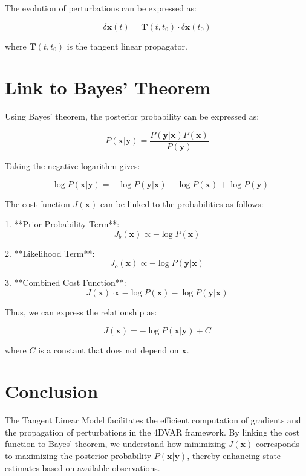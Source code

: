 \documentclass{article}
\begin{document}
The evolution of perturbations can be expressed as:

\[
\delta \mathbf{x}(t) = \mathbf{T}(t, t_0) \cdot \delta \mathbf{x}(t_0)
\]

where \( \mathbf{T}(t, t_0) \) is the tangent linear propagator.

\section{Link to Bayes' Theorem}

Using Bayes' theorem, the posterior probability can be expressed as:

\[
P(\mathbf{x} | \mathbf{y}) = \frac{P(\mathbf{y} | \mathbf{x}) P(\mathbf{x})}{P(\mathbf{y})}
\]

Taking the negative logarithm gives:

\[
-\log P(\mathbf{x} | \mathbf{y}) = -\log P(\mathbf{y} | \mathbf{x}) - \log P(\mathbf{x}) + \log P(\mathbf{y})
\]

The cost function \( J(\mathbf{x}) \) can be linked to the probabilities as follows:

1. **Prior Probability Term**:
   \[
   J_b(\mathbf{x}) \propto -\log P(\mathbf{x})
   \]

2. **Likelihood Term**:
   \[
   J_o(\mathbf{x}) \propto -\log P(\mathbf{y} | \mathbf{x})
   \]

3. **Combined Cost Function**:
   \[
   J(\mathbf{x}) \propto -\log P(\mathbf{x}) - \log P(\mathbf{y} | \mathbf{x})
   \]

Thus, we can express the relationship as:

\[
J(\mathbf{x}) = -\log P(\mathbf{x} | \mathbf{y}) + C
\]

where \( C \) is a constant that does not depend on \( \mathbf{x} \).

\section{Conclusion}

The Tangent Linear Model facilitates the efficient computation of gradients and the propagation of perturbations in the 4DVAR framework. By linking the cost function to Bayes' theorem, we understand how minimizing \( J(\mathbf{x}) \) corresponds to maximizing the posterior probability \( P(\mathbf{x} | \mathbf{y}) \), thereby enhancing state estimates based on available observations.
\end{document}

